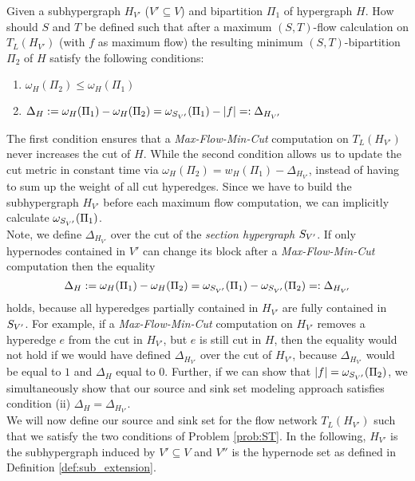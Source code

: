 \begin{problem}
\label{prob:ST} 
Given a subhypergraph $H_{V'}$ ($V' \subseteq V$) and bipartition $\Pi_1$ of hypergraph $H$.
How should $S$ and $T$ be defined such that after a maximum $(S,T)$-flow calculation on $T_L(H_{V'})$ (with 
$f$ as maximum flow) the resulting minimum $(S,T)$-bipartition $\Pi_2$ of $H$ satisfy
the following conditions:
\begin{enumerate}
\item $\omega_H(\Pi_2) \le \omega_H(\Pi_1)$
\item $\Delta_{H} := \omega_H(\Pi_1) - \omega_H(\Pi_2) = \omega_{S_{V'}}(\Pi_1) - |f| =: \Delta_{H_{V'}}$
\end{enumerate}
\end{problem}

The first condition ensures that a \emph{Max-Flow-Min-Cut} computation on $T_L(H_{V'})$ never 
increases the cut of $H$. While the second condition allows us to update the cut metric in
constant time via $\omega_H(\Pi_2) = w_H(\Pi_1) - \Delta_{H_{V'}}$, instead of having 
to sum up the weight of all cut hyperedges. Since we have to build the subhypergraph
$H_{V'}$ before each maximum flow computation, we can implicitly calculate $\omega_{S_{V'}}(\Pi_1)$.\\
Note, we define $\Delta_{H_{V'}}$ over the cut of the \emph{section hypergraph} $S_{V'}$.
If only hypernodes contained in $V'$ can change its block after a \emph{Max-Flow-Min-Cut} computation
then the equality
\[\Delta_{H} := \omega_H(\Pi_1) - \omega_H(\Pi_2) = \omega_{S_{V'}}(\Pi_1) - \omega_{S_{V'}}(\Pi_2) =: \Delta_{H_{V'}}\]
holds, because all hyperedges partially contained in $H_{V'}$ are fully contained in $S_{V'}$.
For example, if a \emph{Max-Flow-Min-Cut} computation
on $H_{V'}$ removes a hyperedge $e$ from the cut in $H_{V'}$, but $e$ is still cut in
$H$, then the equality would not hold if we would have defined $\Delta_{H_{V'}}$ over the cut
of $H_{V'}$, because $\Delta_{H_{V'}}$ would be equal to $1$ and $\Delta_{H}$
equal to $0$. Further, if we can show that $|f| = \omega_{S_{V'}}(\Pi_2)$, 
we simultaneously show that our source and sink set modeling approach satisfies condition (ii) 
$\Delta_H = \Delta_{H_{V'}}$. \\
We will now define our source and sink set for the flow network $T_L(H_{V'})$ such that
we satisfy the two conditions of Problem \ref{prob:ST}. In the following, $H_{V'}$ is 
the subhypergraph induced by $V' \subseteq V$ and $V''$ is the hypernode set as defined 
in Definition \ref{def:sub_extension}.

